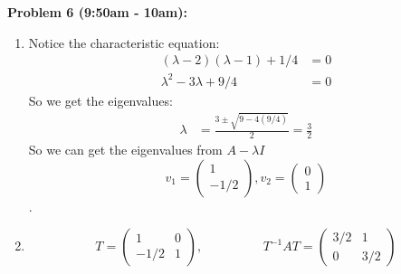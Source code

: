 \documentclass[11pt]{article}
\newenvironment{problem}[1]{\textbf{Problem #1: }}{\newpage}
\begin{document}
	\begin{problem}{6 (9:50am - 10am)}
		\begin{enumerate}[label = (\alph*)]
			\item Notice the characteristic equation:
			\begin{align*}
				(\lambda - 2)(\lambda - 1) + 1/4 &= 0 \\
				\lambda^2 - 3\lambda + 9/4 &= 0
			\end{align*}
			So we get the eigenvalues:
			\begin{align*}
				\lambda &= \frac{3 \pm \sqrt{9 - 4(9/4)}}{2} = \frac{3}{2}
			\end{align*}
			So we can get the eigenvalues from $A - \lambda I$
			\[v_1 = \begin{pmatrix}
				1 \\ -1/2
			\end{pmatrix}, v_2 = \begin{pmatrix}
				0 \\ 1
			\end{pmatrix}\].
			\item \[T = \begin{pmatrix}
				1 & 0 \\
				-1/2 & 1
			\end{pmatrix},\hspace{2cm} T^{-1}AT = \begin{pmatrix}
				3/2 & 1 \\
				0 &  3/2
			\end{pmatrix}\]
		\end{enumerate}
	\end{problem}
\end{document}
